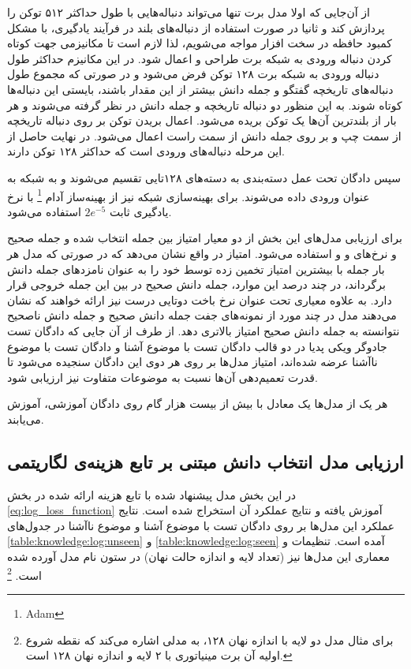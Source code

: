 از آن‌جایی که اولا مدل برت تنها می‌تواند دنباله‌هایی با طول حداکثر ۵۱۲ توکن را پردازش کند و ثانیا در صورت استفاده از دنباله‌های بلند در فرآیند یادگیری، با مشکل کمبود حافظه در سخت افزار مواجه می‌شویم، لذا لازم است تا مکانیزمی جهت کوتاه کردن دنباله ورودی به شبکه برت طراحی و اعمال شود. در این مکانیزم حداکثر طول دنباله ورودی به شبکه برت ۱۲۸ توکن فرض می‌شود و در صورتی که مجموع طول دنباله‌های تاریخچه گفتگو و جمله دانش بیشتر از این مقدار باشند، بایستی این دنباله‌ها کوتاه شوند. به این منظور دو دنباله تاریخچه و جمله دانش در نظر گرفته می‌شوند و هر بار از بلندترین آن‌ها یک توکن بریده می‌شود. اعمال بریدن توکن بر روی دنباله تاریخچه از سمت چپ و بر روی جمله دانش از سمت راست اعمال می‌شود. در نهایت حاصل از این مرحله دنباله‌های ورودی است که حداکثر ۱۲۸ توکن دارند. 

سپس دادگان تحت عمل دسته‌بندی به دسته‌های ۱۲۸تایی تقسیم می‌شوند و به شبکه به عنوان ورودی داده می‌شوند. برای بهینه‌سازی شبکه نیز از بهینه‌ساز آدام
\footnote{Adam}
با نرخ یادگیری ثابت 
$2e^{-5}$
استفاده می‌شود.

برای ارزیابی مدل‌های این بخش از دو معیار امتیاز
بین جمله انتخاب شده و جمله صحیح
و نرخ‌های 
 و  و 
استفاده می‌شود. امتیاز
در واقع نشان می‌دهد که در صورتی که مدل هر بار 
جمله  با بیشترین امتیاز تخمین زده توسط خود را به عنوان نامزد‌های جمله دانش برگرداند، در چند درصد این موارد، جمله دانش صحیح در بین این 
جمله خروجی قرار دارد. 
به علاوه معیاری تحت عنوان نرخ باخت دوتایی درست نیز ارائه خواهند که نشان می‌دهند مدل در چند مورد از نمونه‌های جفت جمله دانش صحیح و جمله دانش ناصحیح نتوانسته به جمله دانش صحیح امتیاز بالاتری دهد. 
از طرف از آن‌ جایی که دادگان تست جادوگر ویکی پدیا در دو قالب دادگان تست با موضوع آشنا و دادگان تست با موضوع ناآشنا عرضه شده‌اند، امتیاز مدل‌ها بر روی هر دوی این دادگان سنجیده می‌شود تا قدرت تعمیم‌دهی آن‌ها نسبت به موضوعات متفاوت نیز ارزیابی شود.  

هر یک از مدل‌ها یک 
معادل با بیش از بیست هزار گام روی دادگان آموزشی، آموزش می‌یابند.

\subsection{ارزیابی مدل انتخاب دانش مبتنی بر تابع هزینه‌ی لگاریتمی }
\label{chap5:log_eval}
در این بخش مدل‌ پیشنهاد شده با تابع هزینه ارائه شده در بخش 
\ref{eq:log_loss_function}
آموزش یافته و نتایج عملکرد آن استخراج شده است. نتایج عملکرد این مدل‌ها بر روی دادگان تست با موضوع آشنا و موضوع ناآشنا در جدول‌های 
\ref{table:knowledge:log:unseen}
و 
\ref{table:knowledge:log:seen}
آمده است. تنظیمات و معماری این مدل‌ها نیز (تعداد لایه و اندازه حالت نهان) در ستون نام مدل آورده شده است.
\footnote{برای مثال مدل دو لایه با اندازه نهان ۱۲۸، به مدلی اشاره می‌کند که نقطه شروع اولیه آن برت مینیاتوری با ۲ لایه و اندازه نهان ۱۲۸ است.}

